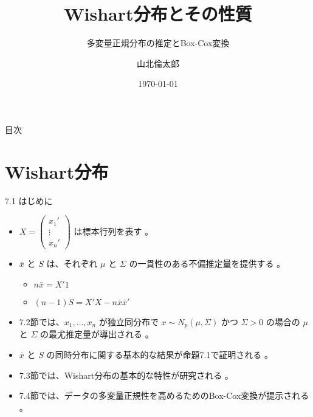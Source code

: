 \documentclass[aspectratio=169]{beamer}
\begin{document}
\begin{CJK}{UTF8}{min}

\title{Wishart分布とその性質}
\subtitle{多変量正規分布の推定とBox-Cox変換}
\author{山北倫太郎}
\date{\today}

\begin{frame}
\titlepage
\end{frame}

\begin{frame}{目次}
\tableofcontents
\end{frame}

\section{Wishart分布}

\begin{frame}{7.1 はじめに}
\begin{itemize}
    \item $X=\begin{pmatrix}x_1' \\ \vdots \\ x_n'\end{pmatrix}$ は標本行列を表す 。
    \item $\bar{x}$ と $S$ は、それぞれ $\mu$ と $\Sigma$ の一貫性のある不偏推定量を提供する 。
    \begin{itemize}
        \item $n\bar{x}=X'1$ 
        \item $(n-1)S=X'X-n\bar{x}\bar{x}'$ 
    \end{itemize}
    \item 7.2節では、$x_1, \dots, x_n$ が独立同分布で $x \sim N_p(\mu, \Sigma)$ かつ $\Sigma>0$ の場合の $\mu$ と $\Sigma$ の最尤推定量が導出される 。
    \item $\bar{x}$ と $S$ の同時分布に関する基本的な結果が命題7.1で証明される 。
    \item 7.3節では、Wishart分布の基本的な特性が研究される 。
    \item 7.4節では、データの多変量正規性を高めるためのBox-Cox変換が提示される 。
\end{itemize}
\end{frame}


\end{CJK}
\end{document}
